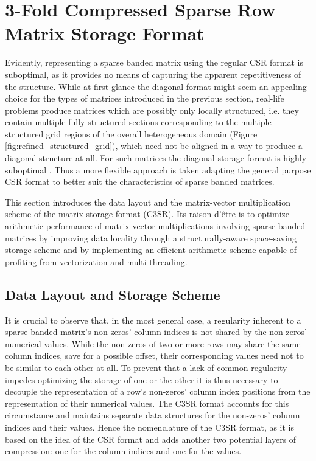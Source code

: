 \chapter{3-Fold Compressed Sparse Row Matrix Storage Format}

  Evidently, representing a sparse banded matrix using the regular CSR format is suboptimal, as it provides no means of
  capturing the apparent repetitiveness of the structure. While at first glance the diagonal format might seem an
  appealing choice for the types of matrices introduced in the previous section, real-life problems produce matrices
  which are possibly only locally structured, i.e. they contain multiple fully structured sections corresponding to the
  multiple structured grid regions of the overall heterogeneous domain (Figure \ref{fig:refined_structured_grid}), which
  need not be aligned in a way to produce a diagonal structure at all. For such matrices the diagonal storage format is
  highly suboptimal \cite{Bell2011}. Thus a more flexible approach is taken adapting the general purpose CSR format to
  better suit the characteristics of sparse banded matrices.

  This section introduces the data layout and the matrix-vector multiplication scheme of the  matrix storage format (C3SR). Its raison d'être is to optimize arithmetic performance of matrix-vector
  multiplications involving sparse banded matrices by improving data locality through a structurally-aware space-saving
  storage scheme and by implementing an efficient arithmetic scheme capable of profiting from vectorization and
  multi-threading.

  \section{Data Layout and Storage Scheme}

    It is crucial to observe that, in the most general case, a regularity inherent to a sparse banded matrix's
    non-zeros' column indices is not shared by the non-zeros' numerical values. While the non-zeros of two or more rows
    may share the same column indices, save for a possible offset, their corresponding values need not to be similar to
    each other at all. To prevent that a lack of common regularity impedes optimizing the storage of one or the other it
    is thus necessary to decouple the representation of a row's non-zeros' column index positions from the
    representation of their numerical values. The C3SR format accounts for this circumstance and maintains separate data
    structures for the non-zeros' column indices and their values. Hence the nomenclature of the C3SR format, as it is
    based on the idea of the CSR format and adds another two potential layers of compression: one for the column indices
    and one for the values.

